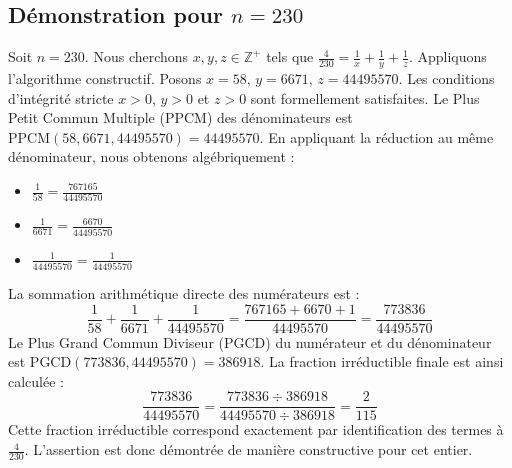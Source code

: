 \documentclass[11pt,a4paper]{article}
\begin{document}
\subsection{Démonstration pour $n = 230$}
Soit $n = 230$. Nous cherchons $x, y, z \in \mathbb{Z}^{+}$ tels que $\frac{4}{230} = \frac{1}{x} + \frac{1}{y} + \frac{1}{z}$.
Appliquons l'algorithme constructif. Posons $x = 58$, $y = 6671$, $z = 44495570$.
Les conditions d'intégrité stricte $x > 0$, $y > 0$ et $z > 0$ sont formellement satisfaites.
Le Plus Petit Commun Multiple (PPCM) des dénominateurs est $\text{PPCM}(58, 6671, 44495570) = 44495570$.
En appliquant la réduction au même dénominateur, nous obtenons algébriquement :
\begin{itemize}
    \item $\frac{1}{58} = \frac{767165}{44495570}$
    \item $\frac{1}{6671} = \frac{6670}{44495570}$
    \item $\frac{1}{44495570} = \frac{1}{44495570}$
\end{itemize}
La sommation arithmétique directe des numérateurs est :
$$ \frac{1}{58} + \frac{1}{6671} + \frac{1}{44495570} = \frac{767165 + 6670 + 1}{44495570} = \frac{773836}{44495570} $$
Le Plus Grand Commun Diviseur (PGCD) du numérateur et du dénominateur est $\text{PGCD}(773836, 44495570) = 386918$.
La fraction irréductible finale est ainsi calculée :
$$ \frac{773836}{44495570} = \frac{773836 \div 386918}{44495570 \div 386918} = \frac{2}{115} $$
Cette fraction irréductible correspond exactement par identification des termes à $\frac{4}{230}$. L'assertion est donc démontrée de manière constructive pour cet entier.
\end{document}
